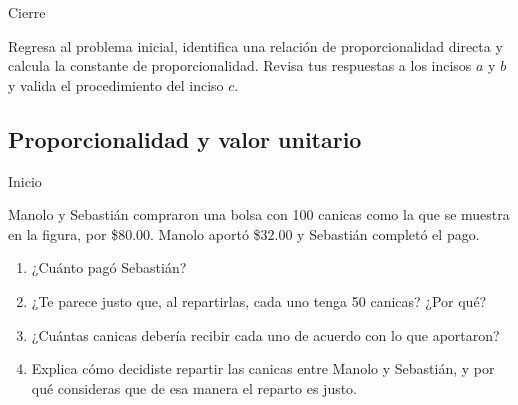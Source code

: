 \documentclass[11pt]{book}
\begin{document}
\begin{boxF}
  \begin{center}\color{colorrds}Cierre\end{center}
  Regresa al problema inicial, identifica una relación de proporcionalidad directa y calcula
  la constante de proporcionalidad.
  Revisa tus respuestas a los incisos $a$ y $b$ y valida el procedimiento del inciso $c$.
\end{boxF}

\subsection{Proporcionalidad y valor unitario}
\begin{boxF}
  \begin{center}\color{colorrds}Inicio\end{center}
  Manolo y Sebastián compraron una bolsa con 100 canicas como la que se muestra en la
  figura, por \$80.00. Manolo aportó \$32.00 y Sebastián completó el pago.
  \begin{enumerate}
    \item ¿Cuánto pagó Sebastián?
    \item ¿Te parece justo que, al repartirlas, cada uno tenga 50 canicas? ¿Por qué?
    \item ¿Cuántas canicas debería recibir cada uno de acuerdo con lo que aportaron?
    \item Explica cómo decidiste repartir las canicas entre Manolo y Sebastián, y por qué
          consideras que de esa manera el reparto es justo.
  \end{enumerate}
\end{boxF}
\end{document}
